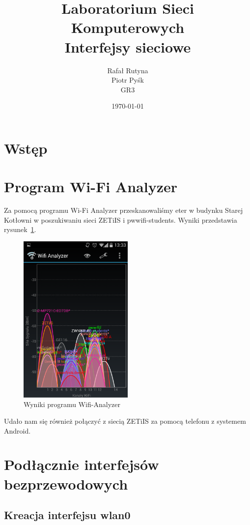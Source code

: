 \documentclass[a4paper,11pt,notitlepage]{article}
\author{Rafał Rutyna \\ Piotr Pyśk \\ GR3}
\title{Laboratorium Sieci Komputerowych \\ {\small Interfejsy sieciowe}}
\date{\today}
\begin{document}
\maketitle
\newpage
\tableofcontents
\newpage

\section{Wstęp}

\section{Program Wi-Fi Analyzer}

Za pomocą programu Wi-Fi Analyzer przeskanowaliśmy eter w budynku Starej 
Kotłowni w poszukiwaniu sieci ZETiIS i pwwifi-students.
Wyniki przedstawia rysunek~\ref{wifi-analyzer}.

\begin{figure}[htb]
  \centering
  \includegraphics[width=0.5\textwidth]{analyzer.png}
  \caption{Wyniki programu Wifi-Analyzer}
  \label{wifi-analyzer}
\end{figure}

Udało nam się również połączyć z siecią ZETiIS za pomocą telefonu z systemem Android.

\section{Podłącznie interfejsów bezprzewodowych}

\subsection{Kreacja interfejsu wlan0}
\end{document}
